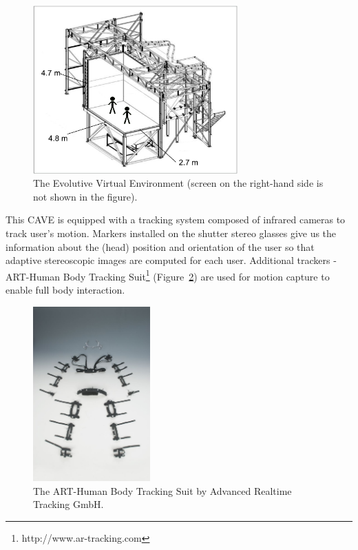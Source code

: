 \begin{appendices}
\begin{figure}[tb]
  \centering
  \includegraphics[width=0.7\textwidth]{figures/app/EVE}
  \caption{\label{fig:EVE}The Evolutive Virtual Environment (screen on the right-hand side is not shown in the figure).}
\end{figure}

This CAVE is equipped with a tracking system composed of infrared cameras to track user's motion. Markers installed on the shutter stereo glasses give us the information about the (head) position and orientation of the user so that adaptive stereoscopic images are computed for each user. Additional trackers - ART-Human Body Tracking Suit\footnote{http://www.ar-tracking.com} (Figure~\ref{fig:mocap}) are used for motion capture to enable full body interaction.

\begin{figure}[tb]
  \centering
  \includegraphics[width=0.4\textwidth]{figures/app/Mocap}
  \caption{\label{fig:mocap}The ART-Human Body Tracking Suit by Advanced Realtime Tracking GmbH.}
\end{figure}


\end{appendices}
